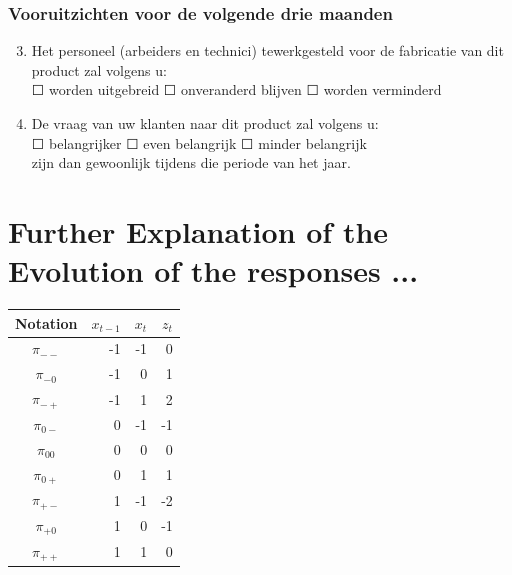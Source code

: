 \documentclass{article}[]
\begin{document}
\subsubsection*{Vooruitzichten voor de volgende drie maanden} 
\begin{enumerate}
\setcounter{enumi}{2}
    \item Het personeel (arbeiders en technici) tewerkgesteld voor de fabricatie van dit product zal volgens u: \\
	$\Square$ worden uitgebreid $\Square$ onveranderd blijven $\Square$ worden verminderd
						
    \item De vraag van uw klanten naar dit product zal volgens u:  \\
	$\Square$ belangrijker $\Square$ even belangrijk $\Square$ minder belangrijk \\	
	zijn dan gewoonlijk tijdens die periode van het jaar.
\end{enumerate}

\section*{Further Explanation of the Evolution of the responses ...}
\label{sec:appendix explanations EIR}

\begin{center}
\begin{tabular}{|c|r|r|r|}
Notation    &  $x_{t-1}$ & $x_t$ & $z_t$ \\\hline
$\pi_{--}$    &  -1  & -1    & 0 \\
$\pi_{-0}$    &  -1  & 0     & 1 \\
$\pi_{-+}$    &  -1  & 1     & 2 \\
$\pi_{0-}$    &  0   & -1    & -1 \\
$\pi_{00}$    &  0   & 0     & 0 \\
$\pi_{0+}$    &  0   & 1     & 1 \\
$\pi_{+-}$    &  1   & -1    & -2 \\
$\pi_{+0}$    &  1   & 0     & -1 \\
$\pi_{++}$    &  1   & 1     & 0 \\
\end{tabular}  
\end{center}

\newpage
\end{document}
